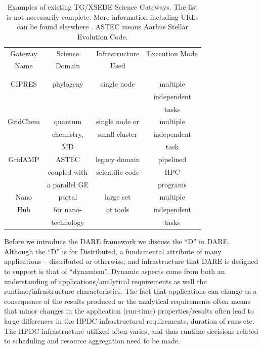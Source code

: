 \documentclass[]{svjour3}
\begin{document}
\begin{table}
\centering
 \small
\begin{tabular}{|c|c|c|c|} 
  \hline Gateway  & Science & Infrastructure & Execution Mode 
  \\
  Name & Domain & Used & \\ 
  &  &  & \\
  & & & \\  \hline \hline 
  
  CIPRES   & phylogeny  &  single node  & multiple  \\
   &  &   & independent   \\ 
  &  &  &  tasks \\  \hline
  GridChem   & quantum & single node or     & multiple  \\
     & chemistry, & small cluster & independent   \\
  & MD &  & task  \\ \hline
   GridAMP     & ASTEC  & legacy domain  & pipelined \\ 
  & coupled with  &  scientific code   & HPC  \\
  & a parallel GE &   &  programs \\ \hline
  Nano  & portal  & large set   & multiple \\
  Hub  & for nano- & of tools  & independent \\
   & technology &  & tasks \\ \hline
  \hline
\end{tabular} \caption{Examples of existing TG/XSEDE Science Gateways. The list is not necessarily complete. More information including URLs can be found elsewhere \cite{tg-sg-list-url}. ASTEC means Aarhus Stellar Evolution Code.}
 \label{table:TG-sg} 
\end{table}

Before we introduce the DARE framework we discuss the ``D'' in
DARE. Although the ``D'' is for Distributed, a fundamental attribute
of many applications -- distributed or otherwise, and infrastructure
that DARE is designed to support is that of ``dynamism''.  Dynamic
aspects come from both an understanding of applications/analytical
requirements as well the runtime/infrastructure characteristics.  The
fact that applications can change as a consequence of the results
produced or the analytical requirements often means that minor changes
in the application (run-time) properties/results often lead to large
differences in the HPDC infrastructural requirements, duration of runs
etc. The HPDC infrastructure utilized often varies, and thus runtime
decisions related to scheduling and resource aggregation need to be made.
\end{document}
